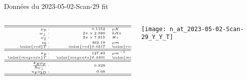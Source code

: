 \begin{frame}[shrink=1]{Données du 2023-05-02-Scan-29  fit }
{\begin{columns}
		\begin{column}{0.3\linewidth}
			$$ 
			{\tiny 
			\begin{array}{rrl}
				\hline
				\hline
				\mu_p:  &  0.1152  & \mu K\\
				\omega_\perp :  & 2 \pi  \times  2.589  & kHz	\\
				\omega_\parallel :  & 2 \pi  \times  7.815 & Hz	\\
				z_0 :  &  462.19 & \mu m	\\
				{\color{red} T : } & {\color{red} 0.0517  } & {\color{red} \mu K}\\			
				\hline
				\hline
				n_p :   &  127.83  & {\mu m}^{-1}\\	
				{\color{magenta} T : } & {\color{magenta} 0.4491  } & {\color{magenta}\mu_p} \\				
				\hline
				\hline	
				\frac{ k_B \mu_p}{\hbar \omega_\perp } :  &  0.928 & 	\\
				n_p a_{3D} :  & 0.68   &  \\
				\hline
				\hline	
			\end{array}
			}
			$$


		\end{column}
		
		\begin{column}{0.7\linewidth}
			\centering
			\texttt{[image: n\_at\_2023-05-02-Scan-29\_Y\_Y\_T]}
		\end{column}


		
	\end{columns}
	}
	

\end{frame}

